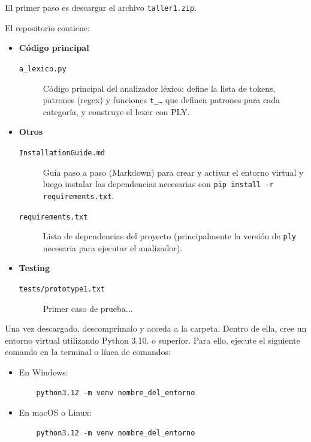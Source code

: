 \documentclass{article}
\begin{document}
El primer paso es descargar el archivo \texttt{taller1.zip}.

El repositorio contiene:
\begin{itemize}
  \item \textbf{Código principal}
  \begin{description}
    \item[\texttt{a\_lexico.py}] Código principal del analizador léxico: 
      define la lista de tokens, patrones (regex) y funciones \texttt{t\_…} que definen patrones
      para cada categoría, y construye el lexer con PLY.
  \end{description}

  \item \textbf{Otros}
  \begin{description}
    \item[\texttt{InstallationGuide.md}] Guía paso a paso (Markdown) para crear y 
      activar el entorno virtual y luego instalar las dependencias necesarias con 
      \texttt{pip install -r requirements.txt}.
    \item[\texttt{requirements.txt}] Lista de dependencias del proyecto 
      (principalmente la versión de \texttt{ply} necesaria para ejecutar el analizador).
  \end{description}

  \item \textbf{Testing}
  \begin{description}
    \item[\texttt{tests/prototype1.txt}] Primer caso de prueba...
  \end{description}
\end{itemize}


Una vez descargado, descomprímalo y acceda a la carpeta. Dentro de ella, cree un 
entorno virtual utilizando Python 3.10. o superior. Para ello, ejecute el siguiente 
comando en 
la terminal o línea de comandos:

\begin{itemize}
  \item En Windows:
        \begin{verbatim}
    python3.12 -m venv nombre_del_entorno
  \end{verbatim}
  \item En macOS o Linux:
        \begin{verbatim}
    python3.12 -m venv nombre_del_entorno
  \end{verbatim}
\end{itemize}
\end{document}
